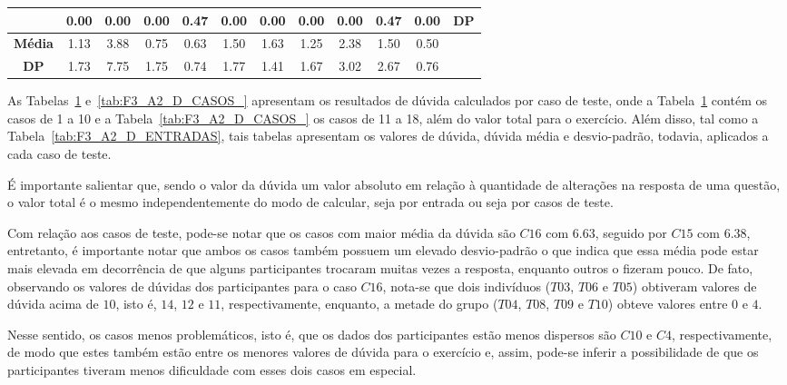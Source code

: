 \begin{table}[htbp]
\begin{tabular}{|c|c|c|c|c|c|c|c|c|c|c|c}
		\rowcolor[HTML]{D9D9D9} 
		\multirow{-3}{*}{\cellcolor[HTML]{F2F2F2}\textbf{T10}} & 0.00 & 0.00 & 0.00 & 0.47 & 0.00 & 0.00 & 0.00 & 0.00 & 0.47 & 0.00 & \multicolumn{1}{c|}{\cellcolor[HTML]{D9D9D9}DP} \\ \hline
		\textbf{Média} & 1.13 & 3.88 & 0.75 & 0.63 & 1.50 & 1.63 & 1.25 & 2.38 & 1.50 & 0.50 & \multicolumn{1}{l}{} \\ \cline{1-11}
		\cellcolor[HTML]{D9D9D9}\textbf{DP} & \cellcolor[HTML]{D9D9D9}1.73 & \cellcolor[HTML]{D9D9D9}7.75 & \cellcolor[HTML]{D9D9D9}1.75 & \cellcolor[HTML]{D9D9D9}0.74 & \cellcolor[HTML]{D9D9D9}1.77 & \cellcolor[HTML]{D9D9D9}1.41 & \cellcolor[HTML]{D9D9D9}1.67 & \cellcolor[HTML]{D9D9D9}3.02 & \cellcolor[HTML]{D9D9D9}2.67 & \cellcolor[HTML]{D9D9D9}0.76 & \multicolumn{1}{l}{} \\ \cline{1-11}
	\end{tabular}
	\label{tab:F3_A2_D_CASOS}
\end{table}

As Tabelas~\ref{tab:F3_A2_D_CASOS} e~\ref{tab:F3_A2_D_CASOS_} apresentam os resultados de dúvida calculados por caso de teste, onde a Tabela~\ref{tab:F3_A2_D_CASOS} contém os casos de 1 a 10 e a Tabela~\ref{tab:F3_A2_D_CASOS_} os casos de 11 a 18, além do valor total para o exercício. Além disso, tal como a Tabela~\ref{tab:F3_A2_D_ENTRADAS}, tais tabelas apresentam os valores de dúvida, dúvida média e desvio-padrão, todavia, aplicados a cada caso de teste.

É importante salientar que, sendo o valor da dúvida um valor absoluto em relação à quantidade de alterações na resposta de uma questão, o valor total é o mesmo independentemente do modo de calcular, seja por entrada ou seja por casos de teste.

Com relação aos casos de teste, pode-se notar que os casos com maior média da dúvida são $C16$ com $6.63$, seguido por $C15$ com $6.38$, entretanto, é importante notar que ambos os casos também possuem um elevado desvio-padrão o que indica que essa média pode estar mais elevada em decorrência de que alguns participantes trocaram muitas vezes a resposta, enquanto outros o fizeram pouco. De fato, observando os valores de dúvidas dos participantes para o caso $C16$, nota-se que dois indivíduos ($T03$, $T06$ e $T05$) obtiveram valores de dúvida acima de $10$, isto é, $14$, $12$ e $11$, respectivamente, enquanto, a metade do grupo ($T04$, $T08$, $T09$ e $T10$) obteve valores entre $0$ e $4$.

Nesse sentido, os casos menos problemáticos, isto é, que os dados dos participantes estão menos dispersos são $C10$ e $C4$, respectivamente, de modo que estes também estão entre os menores valores de dúvida para o exercício e, assim, pode-se inferir a possibilidade de que os participantes tiveram menos dificuldade com esses dois casos em especial.

